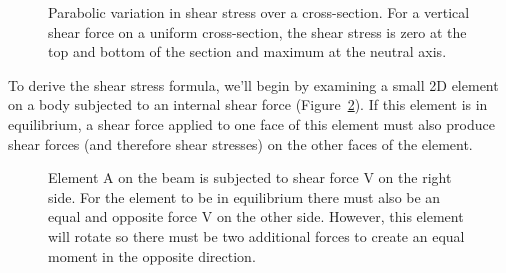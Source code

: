 \documentclass[
  letterpaper,
  DIV=11,
  numbers=noendperiod]{scrreprt}
\theoremstyle{definition}
\theoremstyle{remark}
\begin{document}
\begin{figure}


\caption{\label{fig-10.4}Parabolic variation in shear stress over a
cross-section. For a vertical shear force on a uniform cross-section,
the shear stress is zero at the top and bottom of the section and
maximum at the neutral axis.}

\end{figure}%

To derive the shear stress formula, we'll begin by examining a small 2D
element on a body subjected to an internal shear force
(Figure~\ref{fig-10.5}). If this element is in equilibrium, a shear
force applied to one face of this element must also produce shear forces
(and therefore shear stresses) on the other faces of the element.

\begin{figure}


\caption{\label{fig-10.5}Element A on the beam is subjected to shear
force V on the right side. For the element to be in equilibrium there
must also be an equal and opposite force V on the other side. However,
this element will rotate so there must be two additional forces to
create an equal moment in the opposite direction.}

\end{figure}%
\end{document}
